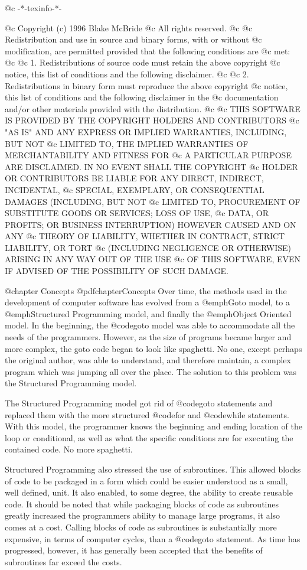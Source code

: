 @c -*-texinfo-*-

@c  Copyright (c) 1996 Blake McBride
@c  All rights reserved.
@c
@c  Redistribution and use in source and binary forms, with or without
@c  modification, are permitted provided that the following conditions are
@c  met:
@c
@c  1. Redistributions of source code must retain the above copyright
@c  notice, this list of conditions and the following disclaimer.
@c
@c  2. Redistributions in binary form must reproduce the above copyright
@c  notice, this list of conditions and the following disclaimer in the
@c  documentation and/or other materials provided with the distribution.
@c
@c  THIS SOFTWARE IS PROVIDED BY THE COPYRIGHT HOLDERS AND CONTRIBUTORS
@c  "AS IS" AND ANY EXPRESS OR IMPLIED WARRANTIES, INCLUDING, BUT NOT
@c  LIMITED TO, THE IMPLIED WARRANTIES OF MERCHANTABILITY AND FITNESS FOR
@c  A PARTICULAR PURPOSE ARE DISCLAIMED. IN NO EVENT SHALL THE COPYRIGHT
@c  HOLDER OR CONTRIBUTORS BE LIABLE FOR ANY DIRECT, INDIRECT, INCIDENTAL,
@c  SPECIAL, EXEMPLARY, OR CONSEQUENTIAL DAMAGES (INCLUDING, BUT NOT
@c  LIMITED TO, PROCUREMENT OF SUBSTITUTE GOODS OR SERVICES; LOSS OF USE,
@c  DATA, OR PROFITS; OR BUSINESS INTERRUPTION) HOWEVER CAUSED AND ON ANY
@c  THEORY OF LIABILITY, WHETHER IN CONTRACT, STRICT LIABILITY, OR TORT
@c  (INCLUDING NEGLIGENCE OR OTHERWISE) ARISING IN ANY WAY OUT OF THE USE
@c  OF THIS SOFTWARE, EVEN IF ADVISED OF THE POSSIBILITY OF SUCH DAMAGE.

@chapter Concepts
@pdfchapter{Concepts}
Over time, the methods used in the development of computer software has
evolved from a @emph{Goto} model, to a @emph{Structured Programming}
model, and finally the @emph{Object Oriented model}.  In the
beginning, the @code{goto} model was able to accommodate all the needs of the
programmers.  However, as the size of programs became larger and
more complex, the goto code began to look like spaghetti.  No one, except
perhaps the original author, was able to understand, and therefore
maintain, a complex program which was jumping all over the place.  The
solution to this problem was the Structured Programming model.

The Structured Programming model got rid of @code{goto} statements and
replaced them with the more structured @code{for} and @code{while}
statements.  With this model, the programmer knows the beginning and
ending location of the loop or conditional, as well as what the specific
conditions are for executing the contained code.  No more spaghetti.

Structured Programming also stressed the use of subroutines.  This
allowed blocks of code to be packaged in a form which could be easier
understood as a small, well defined, unit.  It also enabled, to some
degree, the ability to create reusable code.  It should be noted that
while packaging blocks of code as subroutines greatly increased the
programmers ability to manage large programs, it also comes at a cost.
Calling blocks of code as subroutines is substantially more expensive,
in terms of computer cycles, than a @code{goto} statement.  As time has
progressed, however, it has generally been accepted that the benefits of
subroutines far exceed the costs.

